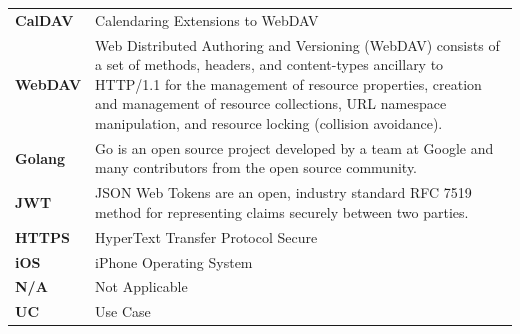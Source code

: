 \documentclass[12pt,a4paper]{report}
\begin{document}
\begin{singlespace}
\begin{center}
\begin{longtable}{p{}p{}}
            \textbf{CalDAV}           & Calendaring Extensions to WebDAV                                                                                                                                             \\[1ex]

            \textbf{WebDAV}           & Web Distributed Authoring and Versioning (WebDAV) consists of a set
            of methods, headers, and content-types ancillary to HTTP/1.1 for the
            management of resource properties, creation and management of
            resource collections, URL namespace manipulation, and resource
            locking (collision avoidance). \cite{def:WebDAV}                                                                                                                                                         \\[1ex]

            \textbf{Golang}           & Go is an open source project developed by a team at Google and many contributors from the open source community. \cite{def:Golang}                                           \\[1ex]

            \textbf{JWT}              & JSON Web Tokens are an open, industry standard RFC 7519 method for representing claims securely between two parties. \cite{def:JWT}                                          \\[1ex]

            \textbf{HTTPS}            & HyperText Transfer Protocol Secure                                                                                                                                           \\[1ex]

            \textbf{iOS}              & iPhone Operating System                                                                                                                                                      \\[1ex]

            \textbf{N/A}              & Not Applicable                                                                                                                                                               \\[1ex]

            \textbf{UC}               & Use Case                                                                                                                                                                     \\[1ex]


\end{longtable}
\end{center}
\end{singlespace}
\end{document}
